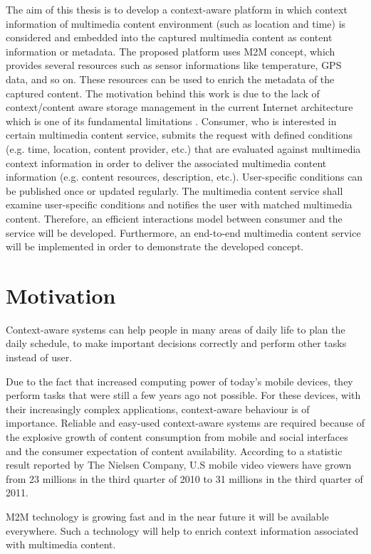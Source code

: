 The aim of this thesis is to develop a context-aware platform in which context information of multimedia content environment (such as location and time) is considered and embedded into the captured multimedia content as content information or metadata. The proposed platform uses M2M concept, which provides several resources such as sensor informations like temperature, GPS data, and so on. These resources can be used to enrich the metadata of the captured content. The motivation behind this work is due to the lack of context/content aware storage management in the current Internet architecture which is one of its fundamental limitations \cite{ec1}. Consumer, who is interested in certain multimedia content service, submits the request with defined conditions (e.g. time, location, content provider, etc.) that are evaluated against multimedia context information in order to deliver the associated multimedia content information (e.g. content resources, description, etc.). User-specific conditions can be published once or updated regularly. The multimedia content service shall examine user-specific conditions and notifies the user with matched multimedia content. Therefore, an efficient interactions model between consumer and the service will be developed. Furthermore, an end-to-end multimedia content service will be implemented in order to demonstrate the developed concept.

\section{Motivation\label{sec:moti}}

Context-aware systems can help people in many areas of daily life to plan the daily schedule, to make important decisions correctly and perform other tasks instead of user.

Due to the fact that increased computing power of today's mobile devices, they perform tasks that were still a few years ago not possible. For these devices, with their increasingly complex applications, context-aware behaviour is of importance. Reliable and easy-used context-aware systems are required because of the explosive growth of content consumption from mobile and social interfaces and the consumer expectation of content availability. According to a statistic result reported by The Nielsen Company, U.S mobile video viewers have grown from 23 millions in the third quarter of 2010 to 31 millions in the third quarter of 2011.

M2M technology is growing fast and in the near future it will be available everywhere. Such a technology will help to enrich context information associated with multimedia content.

